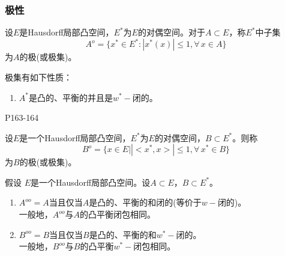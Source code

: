 \begin{example}[缓增广义函数]
	
\end{example}

\subsubsection{极性}

\begin{definition}
	设$E$是Hausdorff局部凸空间，$E^{*}$为$E$的对偶空间。对于$A\subset E$，称$E^{*}$中子集
	\begin{equation*}
		A^{o}=\{ x^{*} \in E^{*} : |x^{*}(x) |\leq 1, \forall \, x\in A \}
	\end{equation*}
	为$A$的极(或极集)。
\end{definition}

\original
{	\par
	极集有如下性质：
	\begin{enumerate}
		\item $A^{*}$是凸的、平衡的并且是$w^{*}-$闭的。
	\end{enumerate}
}
{P163-164}

\begin{definition}
	设$E$是一个Hausdorff局部凸空间，$E^{*}$为$E$的对偶空间，$B\subset E^{*}$。则称
	\begin{equation*}
		B^{o}=\{x\in E\big| |<x^{*},x>|\leq 1,\forall \, x^{*}\in B\}
	\end{equation*}
	为$B$的极(或极集)。
\end{definition}

\begin{theorem}[双极定理]\label{XQHthe080302}
	假设 $E$是一个Hausdorff局部凸空间。设$A\subset E $，$B \subset E^{*} $。
	\begin{enumerate}
		\item $ A^{oo} = A $当且仅当$ A $是凸的、平衡的和闭的(等价于$w-$闭的)。
		\\一般地，$A^{oo}$与$A$的凸平衡闭包相同。
		\item $B^{oo} = B $当且仅当$B$是凸的、平衡的和$w^{*}-$闭的。\\
		一般地，$B^{oo}$与$B$的凸平衡$w^{*}-$闭包相同。
	\end{enumerate}
\end{theorem}













